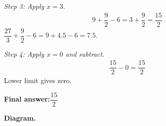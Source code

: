 \documentclass[11pt]{article}
\begin{document}
\textit{Step 3: Apply \( x = 3 \).}
\[\begin{gathered}
9 + \dfrac{9}{2} - 6 = 3 + \dfrac{9}{2} = \dfrac{15}{2}
\end{gathered}\]
\( \dfrac{27}{3} + \dfrac{9}{2} - 6 = 9 + 4.5 - 6 = 7.5 \).

\textit{Step 4: Apply \( x = 0 \) and subtract.}
\[\begin{gathered}
\dfrac{15}{2} - 0 = \dfrac{15}{2}
\end{gathered}\]
Lower limit gives zero.

\begin{answerbox}
\textbf{Final answer:}\quad \(\displaystyle \dfrac{15}{2}\)
\end{answerbox}
\textbf{Diagram.}

\begin{center}
\end{center}
\end{document}
